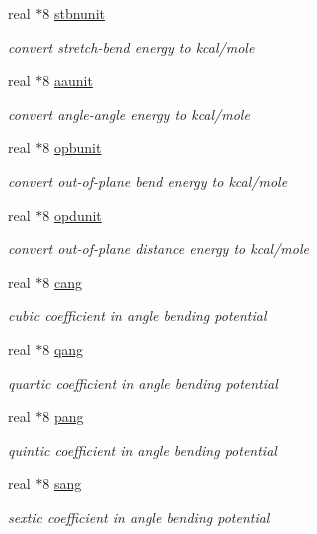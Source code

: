 \begin{DoxyCompactItemize}
real $\ast$8 \hyperlink{classangpot_a8f4817c26ee799292dc6dc788cc83453}{stbnunit}
\begin{DoxyCompactList}\small\item\em convert stretch-\/bend energy to kcal/mole \end{DoxyCompactList}\item 
real $\ast$8 \hyperlink{classangpot_afd96d62ac3593218e061c659324c800a}{aaunit}
\begin{DoxyCompactList}\small\item\em convert angle-\/angle energy to kcal/mole \end{DoxyCompactList}\item 
real $\ast$8 \hyperlink{classangpot_a16ef8e589e9ccff08841188f4eb8b15f}{opbunit}
\begin{DoxyCompactList}\small\item\em convert out-\/of-\/plane bend energy to kcal/mole \end{DoxyCompactList}\item 
real $\ast$8 \hyperlink{classangpot_a9e21db37db7e7ce534b644cd9e3850f0}{opdunit}
\begin{DoxyCompactList}\small\item\em convert out-\/of-\/plane distance energy to kcal/mole \end{DoxyCompactList}\item 
real $\ast$8 \hyperlink{classangpot_ab027336e1adb73f303c64bef48b2076d}{cang}
\begin{DoxyCompactList}\small\item\em cubic coefficient in angle bending potential \end{DoxyCompactList}\item 
real $\ast$8 \hyperlink{classangpot_a1022deb1628dafe61ac691b539fb2c61}{qang}
\begin{DoxyCompactList}\small\item\em quartic coefficient in angle bending potential \end{DoxyCompactList}\item 
real $\ast$8 \hyperlink{classangpot_ad45418268664a5204167270a85a0bf86}{pang}
\begin{DoxyCompactList}\small\item\em quintic coefficient in angle bending potential \end{DoxyCompactList}\item 
real $\ast$8 \hyperlink{classangpot_a406ea898f2fd8574a2354e02b54c235a}{sang}
\begin{DoxyCompactList}\small\item\em sextic coefficient in angle bending potential \end{DoxyCompactList}\item 

\end{DoxyCompactItemize}

